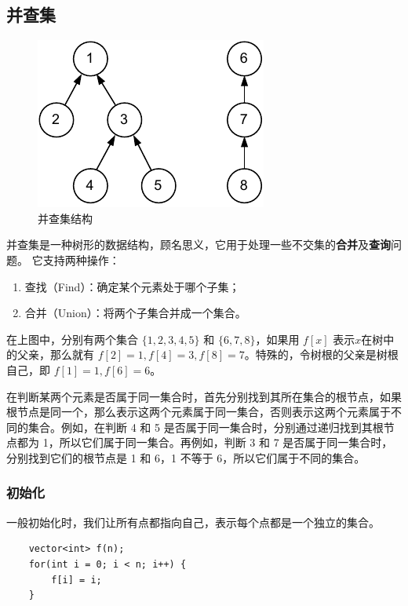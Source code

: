 \documentclass[12pt,a4paper]{article}
\begin{document}
\subsection{并查集}
\begin{figure}[h]
    \centering
    \includegraphics{img/lab6/并查集.pdf}
    \caption{并查集结构}
    \label{fig:uf}
\end{figure}

并查集是一种树形的数据结构，顾名思义，它用于处理一些不交集的\textbf{合并}及\textbf{查询}问题。 它支持两种操作：

\begin{enumerate}[itemsep=2pt,topsep=0pt,parsep=0pt]
    \item 查找（Find）：确定某个元素处于哪个子集；
    \item 合并（Union）：将两个子集合并成一个集合。
\end{enumerate}

在上图中，分别有两个集合 $\{1, 2, 3, 4, 5\}$ 和 $\{6, 7, 8\}$，如果用 $f[x]$ 表示$x$在树中的父亲，那么就有 $f[2] = 1, f[4] = 3, f[8] = 7$。特殊的，令树根的父亲是树根自己，即 $f[1] = 1, f[6] = 6$。

在判断某两个元素是否属于同一集合时，首先分别找到其所在集合的根节点，如果根节点是同一个，那么表示这两个元素属于同一集合，否则表示这两个元素属于不同的集合。例如，在判断 4 和 5 是否属于同一集合时，分别通过递归找到其根节点都为 1，所以它们属于同一集合。再例如，判断 3 和 7 是否属于同一集合时，分别找到它们的根节点是 1 和 6，1 不等于 6，所以它们属于不同的集合。

\subsubsection{初始化}

一般初始化时，我们让所有点都指向自己，表示每个点都是一个独立的集合。
\begin{lstlisting}
    vector<int> f(n);
    for(int i = 0; i < n; i++) {
        f[i] = i;
    }
\end{lstlisting}
\end{document}
